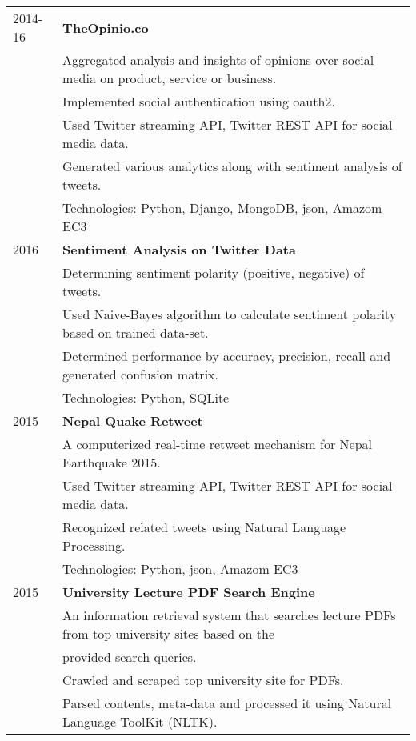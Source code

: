 \documentclass[letterpaper,10pt,oneside]{article}
\newcommand{\nextitem}{\par\hspace*{\labelsep}\textbullet\hspace*{\labelsep}}
\begin{document}
\noindent \begin{tabular}{l l}
 2014-16 & \textbf{TheOpinio.co} \\
         & Aggregated analysis and insights of opinions over social media on product, service or business. \\
         & \footnotesize{\nextitem  Implemented social authentication using oauth2.} \\
         & \footnotesize{\nextitem  Used Twitter streaming API, Twitter REST API for social media data.} \\
         & \footnotesize{\nextitem  Generated various analytics along with sentiment analysis of tweets.} \\
         & Technologies: Python, Django, MongoDB, json, Amazom EC3 \\
 2016    & \textbf{Sentiment Analysis on Twitter Data} \\
         & Determining sentiment polarity (positive, negative) of tweets. \\
         & \footnotesize{\nextitem Used Naive-Bayes algorithm to calculate sentiment polarity based on trained data-set.} \\
         & \footnotesize{\nextitem Determined performance by accuracy, precision, recall and generated confusion matrix.} \\
         & Technologies: Python, SQLite \\
 2015    & \textbf{Nepal Quake Retweet} \\
         & A computerized real-time retweet mechanism for Nepal Earthquake 2015. \\
         & \footnotesize{\nextitem  Used Twitter streaming API, Twitter REST API for social media data.} \\
         & \footnotesize{\nextitem Recognized related tweets using Natural Language Processing.} \\
         & Technologies: Python, json, Amazom EC3 \\
 2015    & \textbf{University Lecture PDF Search Engine} \\
         & An information retrieval system that searches lecture PDFs from top university sites based on the \\
         & provided search queries. \\
         & \footnotesize{\nextitem Crawled and scraped top university site for PDFs.} \\
         & \footnotesize{\nextitem Parsed contents, meta-data and processed it using Natural Language ToolKit (NLTK).} \\

\end{tabular}
\end{document}
